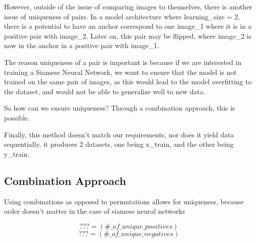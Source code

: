 \documentclass[
	letterpaper, %
	10pt, %
	unnumberedsections, %
	twoside, %
]{LTJournalArticle}
\begin{document}
However, outside of the issue of comparing images to themselves, there is another issue of uniqueness of pairs.
In a model architecture where learning\_size = 2, there is a potential to have an anchor correspond to one image\_1 where it is in a positive pair with image\_2. Later on, this pair may be flipped, where image\_2 is now in the anchor in a positive pair with image\_1.


 
The reason uniqueness of a pair is important is because if we are interested in training a Siamese Neural Network, we want to ensure that the model is not trained on the same pair of images, as this would lead to the model overfitting to the dataset, and would not be able to generalize well to new data.

So how can we ensure uniqueness? Through a combination approach, this is possible.

Finally, this method doesn't match our requirements, nor does it yield data sequentially, it produces 2 datasets, one being x\_train, and the other being y\_train.

\subsection{Combination Approach}

Using combinations as opposed to permutations allows for uniqueness, because order doesn't matter in the case of siamese neural networks

\[ ??? = (\#\_of\_unique\_positives) \]
\[ ??? = (\#\_of\_unique\_negatives) \]
\end{document}
